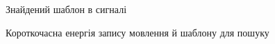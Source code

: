 \begin{figure}[!h]
    \caption{Знайдений шаблон в сигналі}\label{fig:matched-plain-audio}
\end{figure}

\begin{figure}[!h]
    \centering
    \caption{Короткочасна енергія запису мовлення й шаблону для пошуку}\label{fig:audio-energy}
\end{figure}

